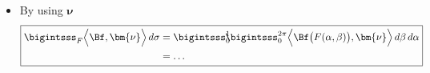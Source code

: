 \documentclass[12pt]{article}
\begin{document}
\begin{enumerate}[(i)]
\begin{itemize}
		      \item  By using $\bm{\nu}$
		            \begin{align}
			            \boxed{
				            \begin{aligned}
					            \bigintsss_F
					            \Big\langle \Bf , \bm{\nu} \Big\rangle \,d\sigma
					             & 
					            = \bigintsss_0^1 \!\!\! \bigintsss_0^{2\pi}
					            \Big\langle \Bf\big(F(\alpha,\beta)\big), \bm{\nu} \Big\rangle
					            \,d\beta \, d\alpha                            
					            \\
					             & 
					            = \dots
				            \end{aligned}
			            }
		            \end{align}
	      \end{itemize}
\end{enumerate}

\clearpage
\end{document}
